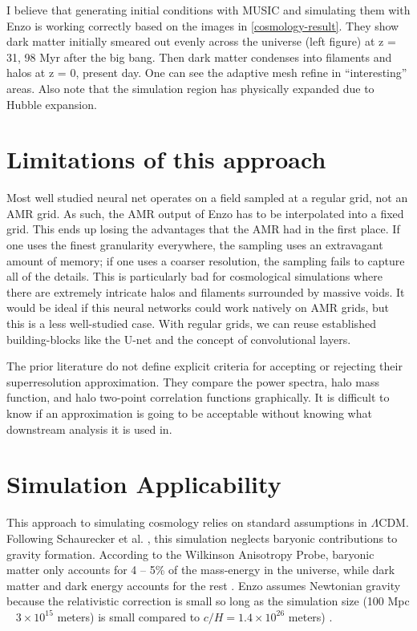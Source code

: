 I believe that generating initial conditions with MUSIC \cite{hahn_multi-scale_2011} and simulating them with Enzo \cite{collins_cosmological_2010,bryan_enzo_2014} is working correctly based on the images in \cref{cosmology-result}. They show dark matter initially smeared out evenly across the universe (left figure) at z = 31, 98 Myr after the big bang. Then dark matter condenses into filaments and halos at z = 0, present day. One can see the adaptive mesh refine in ``interesting'' areas. Also note that the simulation region has physically expanded due to Hubble expansion.


\section{Limitations of this approach}

Most well studied neural net operates on a field sampled at a regular grid, not an AMR grid. As such, the AMR output of Enzo has to be interpolated into a fixed grid. This ends up losing the advantages that the AMR had in the first place. If one uses the finest granularity everywhere, the sampling uses an extravagant amount of memory; if one uses a coarser resolution, the sampling fails to capture all of the details. This is particularly bad for cosmological simulations where there are extremely intricate halos and filaments surrounded by massive voids. It would be ideal if this neural networks could work natively on AMR grids, but this is a less well-studied case. With regular grids, we can reuse established building-blocks like the U-net and the concept of convolutional layers.

The prior literature \cite{schaurecker_super-resolving_2021,li_ai-assisted_2021} do not define explicit criteria for accepting or rejecting their superresolution approximation. They compare the power spectra, halo mass function, and halo two-point correlation functions graphically. It is difficult to know if an approximation is going to be acceptable without knowing what downstream analysis it is used in.

\section{Simulation Applicability}

This approach to simulating cosmology relies on standard assumptions in \(\Lambda\)CDM. Following Schaurecker et al. \cite{schaurecker_super-resolving_2021}, this simulation neglects baryonic contributions to gravity formation. According to the Wilkinson Anisotropy Probe, baryonic matter only accounts for 4 -- 5\% of the mass-energy in the universe, while dark matter and dark energy accounts for the rest \cite{hinshaw_nine-year_2013}. Enzo assumes Newtonian gravity because the relativistic correction is small so long as the simulation size (100 Mpc ~ \(3 \times 10^{15}\) meters) is small compared to \(c / H = 1.4 \times 10^{26}\) meters) \cite{bryan_enzo_2014}.

